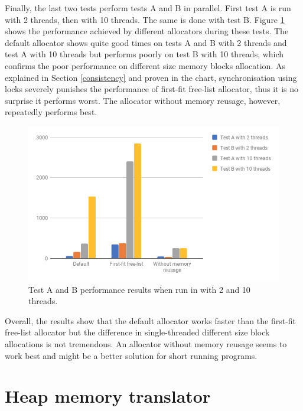 \documentclass[bsc,frontabs,twoside,singlespacing,parskip,deptreport]{infthesis}     %
\begin{document}
Finally, the last two tests perform tests A and B in parallel. First test A is run with 2 threads, then with 10 threads. The same is done with test B. Figure \ref{teste_f} shows the performance achieved by different allocators during these tests. The default allocator shows quite good times on tests A and B with 2 threads and test A with 10 threads but performs poorly on test B with 10 threads, which confirms the poor performance on different size memory blocks allocation. As explained in Section \ref{consistency} and proven in the chart, synchronisation using locks severely punishes the performance of first-fit free-list allocator, thus it is no surprise it performs worst. The allocator without memory reusage, however, repeatedly performs best.

\begin{figure}[H]
	\centering
	\includegraphics[width=12cm]{allocator_test_e}
	\caption{Test A and B performance results when run in with 2 and 10 threads.}
	\label{teste_f}
\end{figure}

Overall, the results show that the default allocator works faster than the first-fit free-list allocator but the difference in single-threaded different size block allocations is not tremendous. An allocator without memory reusage seems to work best and might be a better solution for short running programs.











\chapter{Heap memory translator}
\label{heap-memory-translator}
\end{document}
